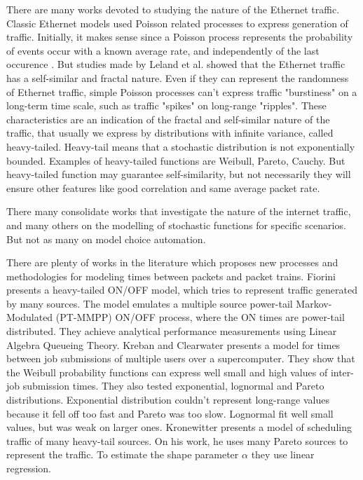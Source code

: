 There are many works devoted to studying the nature of the Ethernet traffic\cite{selfsimilar-ethernet}. Classic Ethernet models used Poisson related processes to express generation of traffic. Initially, it makes sense since a Poisson process represents the probability of events occur with a known average rate, and independently of the last occurence\cite{selfsimilar-ethernet} \cite{book-poisson}. But studies made by Leland et al.\cite{selfsimilar-ethernet} showed that the Ethernet traffic has a self-similar and fractal nature. Even if they can represent the randomness of Ethernet traffic, simple Poisson processes can't express traffic "burstiness" on a long-term time scale, such as traffic "spikes" on long-range "ripples". These characteristics are an indication of the fractal and self-similar nature of the traffic, that usually we express by distributions with infinite variance, called heavy-tailed. Heavy-tail means that a stochastic distribution is not exponentially bounded\cite{sourcesonoff-paper}. Examples of heavy-tailed functions are Weibull, Pareto, Cauchy.  But heavy-tailed function may guarantee self-similarity, but not necessarily they will ensure other features like good correlation and same average packet rate.

There many consolidate works that investigate the nature of the internet traffic\cite{selfsimilar-ethernet}\cite{analysis-self-similar}\cite{stochartic-selfsimilar}\cite{selfsimilar-highvariability}\cite{multi-player-online-game-self-similarity}, and many others on the modelling of stochastic functions for specific scenarios\cite{estimation-renewal-function-ethernet-traffic}\cite{modelling-of-self-similar}\cite{empirical-interarrival-study}\cite{modeling-concurrent-heavy-tailed}\cite{optimal-scheduling-of-heavy-tailed-traffic}\cite{modelling-of-self-similar}. But not as many on model choice automation\cite{sourcesonoff-paper}.

There are plenty of works in the literature which proposes new processes and methodologies for modeling times between packets and packet trains. Fiorini \cite{modeling-concurrent-heavy-tailed} presents a heavy-tailed ON/OFF model, which tries to represent traffic generated by many sources. The model emulates a multiple source power-tail Markov-Modulated (PT-MMPP) ON/OFF process, where the ON times are power-tail distributed. They achieve analytical performance measurements using Linear Algebra Queueing Theory. Kreban and Clearwater\cite{hierarchical-dynamics-interarrival-times} presents a model for times between job submissions of multiple users over a supercomputer. They show that the Weibull probability functions can express well small and high values of inter-job submission times. They also tested exponential, lognormal and Pareto distributions. Exponential distribution couldn't represent long-range values because it fell off too fast and Pareto was too slow. Lognormal fit well small values, but was weak on larger ones. Kronewitter\cite{optimal-scheduling-of-heavy-tailed-traffic} presents a model of scheduling traffic of many heavy-tail sources. On his work, he uses many Pareto sources to represent the traffic. To estimate the shape parameter $\alpha$ they use linear regression.

